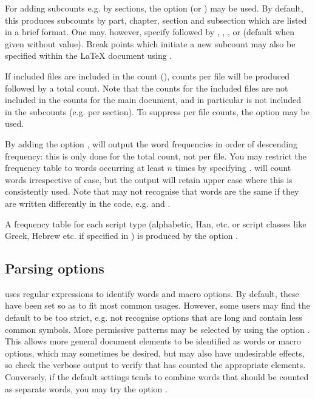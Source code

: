 \documentclass{article}
\begin{document}
For adding subcounts e.g. by sections, the option  (or ) may be used. By default, this produces subcounts by part, chapter, section and subsection which are listed in a brief format. One may, however, specify  followed by , , , or  (default when given without value). Break points which initiate a new subcount may also be specified within the \LaTeX{} document using .

If included files are included in the count (), counts per file will be produced followed by a total count. Note that the counts for the included files are not included in the counts for the main document, and in particular is not included in the subcounts (e.g. per section). To suppress per file counts, the option  may be used.

By adding the option , \TeXcount{} will output the word frequencies in order of descending frequency: this is only done for the total count, not per file. You may restrict the frequency table to words occurring at least $n$ times by specifying . \TeXcount{} will count words irrespective of case, but the output will retain upper case where this is consistently used. Note that \TeXcount{} may not recognise that words are the same if they are written differently in the code, e.g.  and .

A frequency table for each script type (alphabetic, Han, etc. or script classes like Greek, Hebrew etc. if specified in ) is produced by the option . 


\subsection{Parsing options}

\TeXcount{} uses regular expressions to identify words and macro options. By default, these have been set so as to fit most common usages. However, some users may find the default to be too strict, e.g. not recognise options that are long and contain less common symbols. More permissive patterns may be selected by using the option . This allows more general document elements to be identified as words or macro options, which may sometimes be desired, but may also have undesirable effects, so check the verbose output to verify that \TeXcount{} has counted the appropriate elements. Conversely, if the default settings tends to combine words that should be counted as separate words, you may try the option . 
\end{document}
